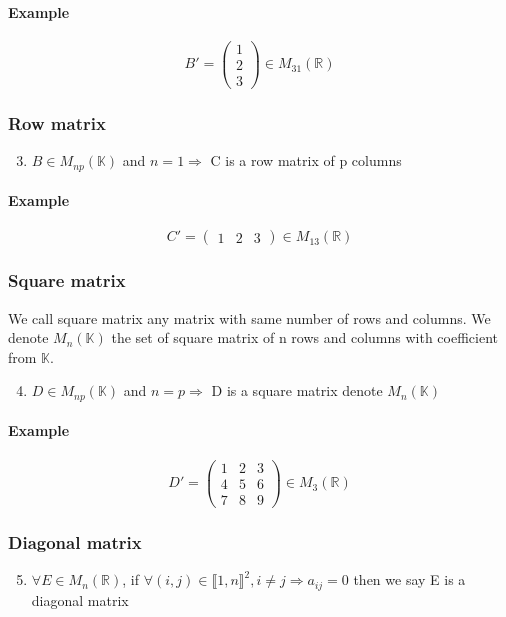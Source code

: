 \documentclass[notitlepage]{math}
\begin{document}
\paragraph{Example}
\[ B' = \begin{pmatrix}
    1 \\
    2 \\
    3
\end{pmatrix} \in M_{31}(\mathbb{R})\]

\subsubsection{Row matrix}
    \begin{enumerate}
        \setcounter{enumi}{2}
        \item $B \in M_{np}(\mathbb{K})$ and $ n = 1 \Rightarrow $ C is a row matrix of p columns
    \end{enumerate}
    \paragraph{Example}
    \[ C' = \begin{pmatrix}
        1 & 2 & 3
    \end{pmatrix} \in M_{13}(\mathbb{R})\]

\subsubsection{Square matrix}
    We call square matrix any matrix with same number of rows and columns.
    We denote $M_{n}(\mathbb{K})$ the set of square matrix of n rows and columns with coefficient from $\mathbb{K}$.
    \begin{enumerate}
        \setcounter{enumi}{3}
        \item $D \in M_{np}(\mathbb{K})$ and $ n = p \Rightarrow $ D is a square matrix denote $M_{n}(\mathbb{K})$
    \end{enumerate}
    \paragraph{Example}
    \[ D' = \begin{pmatrix}
        1 & 2 & 3 \\
        4 & 5 & 6 \\
        7 & 8 & 9
    \end{pmatrix} \in M_{3}(\mathbb{R})\]

\subsubsection{Diagonal matrix}
    \begin{enumerate}
        \setcounter{enumi}{4}
        \item $\forall E \in M_{n}(\mathbb{R})$, if $\forall (i,j) \in \llbracket 1,n \rrbracket ^2, i \neq j \Rightarrow a_{ij} = 0$ then we say E is a diagonal matrix
    \end{enumerate}
\end{document}
